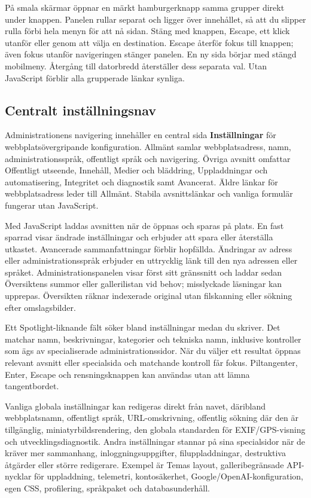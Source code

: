 \documentclass[11pt,a4paper]{article}
\begin{document}
På smala skärmar öppnar en märkt hamburgerknapp samma grupper direkt under
knappen. Panelen rullar separat och ligger över innehållet, så att du slipper
rulla förbi hela menyn för att nå sidan. Stäng med knappen, Escape, ett klick
utanför eller genom att välja en destination. Escape återför fokus till knappen;
även fokus utanför navigeringen stänger panelen. En ny sida börjar med stängd
mobilmeny. Återgång till datorbredd återställer dess separata val. Utan
JavaScript förblir alla grupperade länkar synliga.

\subsection{Centralt inställningsnav}

Administrationens navigering innehåller en central sida \textbf{Inställningar}
för webbplatsövergripande konfiguration. Allmänt samlar webbplatsadress, namn,
administrationsspråk, offentligt språk och navigering. Övriga avsnitt omfattar
Offentligt utseende, Innehåll, Medier och bläddring, Uppladdningar och
automatisering, Integritet och diagnostik samt Avancerat. Äldre länkar för
webbplatsadress leder till Allmänt. Stabila avsnittslänkar och vanliga formulär
fungerar utan JavaScript.

Med JavaScript laddas avsnitten när de öppnas och sparas på plats. En fast
sparrad visar ändrade inställningar och erbjuder att spara eller återställa
utkastet. Avancerade sammanfattningar förblir hopfällda. Ändringar av adress
eller administrationsspråk erbjuder en uttrycklig länk till den nya adressen
eller språket. Administrationspanelen visar först sitt gränssnitt och laddar
sedan Översiktens summor eller gallerilistan vid behov; misslyckade läsningar
kan upprepas. Översikten räknar indexerade original utan filskanning eller
sökning efter omslagsbilder.

Ett Spotlight-liknande fält söker bland inställningar medan du skriver. Det
matchar namn, beskrivningar, kategorier och tekniska namn, inklusive kontroller
som ägs av specialiserade administrationssidor. När du väljer ett resultat
öppnas relevant avsnitt eller specialsida och matchande kontroll får fokus.
Piltangenter, Enter, Escape och rensningsknappen kan användas utan att lämna
tangentbordet.

Vanliga globala inställningar kan redigeras direkt från navet, däribland
webbplatsnamn, offentligt språk, URL-omskrivning, offentlig sökning där den är
tillgänglig, miniatyrbildsrendering, den globala standarden för EXIF/GPS-visning
och utvecklingsdiagnostik. Andra inställningar stannar på sina specialsidor när
de kräver mer sammanhang, inloggningsuppgifter, filuppladdningar, destruktiva
åtgärder eller större redigerare. Exempel är Temas layout, galleribegränsade
API-nycklar för uppladdning, telemetri, kontosäkerhet,
Google/OpenAI-konfiguration, egen CSS, profilering, språkpaket och
databasunderhåll.
\end{document}
